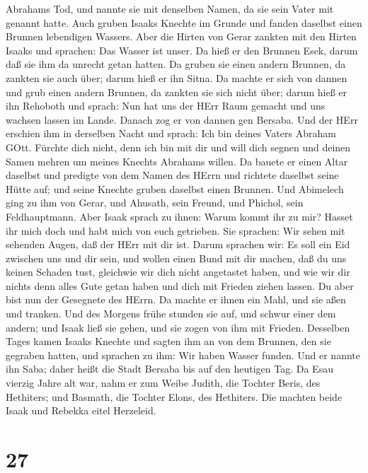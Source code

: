 Abrahams Tod, und nannte sie mit denselben Namen, da sie sein Vater mit
genannt hatte.  Auch gruben Isaaks Knechte im Grunde und
fanden daselbst einen Brunnen lebendigen Wassers.  Aber die
Hirten von Gerar zankten mit den Hirten Isaaks und sprachen: Das Wasser
ist unser. Da hieß er den Brunnen Esek, darum daß sie ihm da unrecht
getan hatten.  Da gruben sie einen andern Brunnen, da
zankten sie auch über; darum hieß er ihn Sitna.  Da machte
er sich von dannen und grub einen andern Brunnen, da zankten sie sich
nicht über; darum hieß er ihn Rehoboth und sprach: Nun hat uns der HErr
Raum gemacht und uns wachsen lassen im Lande.  Danach zog
er von dannen gen Bersaba.  Und der HErr erschien ihm in
derselben Nacht und sprach: Ich bin deines Vaters Abraham GOtt. Fürchte
dich nicht, denn ich bin mit dir und will dich segnen und deinen Samen
mehren um meines Knechts Abrahams willen.  Da bauete er
einen Altar daselbst und predigte von dem Namen des HErrn und richtete
daselbst seine Hütte auf; und seine Knechte gruben daselbst einen
Brunnen.  Und Abimelech ging zu ihm von Gerar, und Ahusath,
sein Freund, und Phichol, sein Feldhauptmann.  Aber Isaak
sprach zu ihnen: Warum kommt ihr zu mir? Hasset ihr mich doch und habt
mich von euch getrieben.  Sie sprachen: Wir sehen mit
sehenden Augen, daß der HErr mit dir ist. Darum sprachen wir: Es soll
ein Eid zwischen uns und dir sein, und wollen einen Bund mit dir machen,
 daß du uns keinen Schaden tust, gleichwie wir dich nicht
angetastet haben, und wie wir dir nichts denn alles Gute getan haben und
dich mit Frieden ziehen lassen. Du aber bist nun der Gesegnete des
HErrn.  Da machte er ihnen ein Mahl, und sie aßen und
tranken.  Und des Morgens frühe stunden sie auf, und schwur
einer dem andern; und Isaak ließ sie gehen, und sie zogen von ihm mit
Frieden.  Desselben Tages kamen Isaaks Knechte und sagten
ihm an von dem Brunnen, den sie gegraben hatten, und sprachen zu ihm:
Wir haben Wasser funden.  Und er nannte ihn Saba; daher
heißt die Stadt Bersaba bis auf den heutigen Tag.  Da Esau
vierzig Jahre alt war, nahm er zum Weibe Judith, die Tochter Beris, des
Hethiters; und Basmath, die Tochter Elons, des Hethiters. 
Die machten beide Isaak und Rebekka eitel Herzeleid.

\hypertarget{section-26}{%
\section{27}\label{section-26}}

